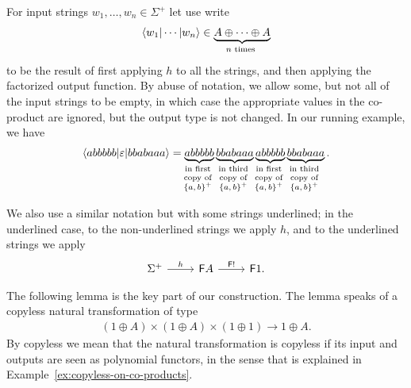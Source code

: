 For  input strings $w_1,\ldots,w_n \in \Sigma^+$ let use write 
\begin{align*}
\tuple{w_1| \cdots | w_n} \in \myunderbrace{A \oplus \cdots \oplus A}{$n$ times}
\end{align*}
to be the result of first applying $h$ to all the strings, and then applying the factorized output function. By abuse of notation, we allow some, but not all of the input strings to be empty, in which case the appropriate values in the co-product are ignored, but the output type is not changed. In our running example, we have 
\begin{align*}
    \tuple{abbbbb | \varepsilon | bbabaaa} =  
    \myunderbrace{abbbbb}{in first \\ copy of \\ $\set{a,b}^+$}
     \myunderbrace{bbabaaa}{in third \\ copy of \\ $\set{a,b}^+$}
     \myunderbrace{abbbbb}{in first \\ copy of \\ $\set{a,b}^+$}
     \myunderbrace{bbabaaa}{in third \\ copy of \\ $\set{a,b}^+$}.
    \end{align*}


We also use a similar notation but with some strings underlined; in the underlined case, to the non-underlined strings we apply $h$, and to the underlined strings we apply 
\[
\begin{tikzcd}
\Sigma^+ 
\ar[r,"h"]
&
\functor A 
\ar[r,"\functor !"]
&
\functor 1.
\end{tikzcd}
\]



The following lemma is the key part of our construction. The lemma speaks of a copyless natural transformation of type 
\begin{align*}
    (1 \oplus A) \times (1 \oplus A) \times (1 \oplus 1) \to 1 \oplus A.
\end{align*}
By copyless we mean that the natural transformation is copyless if its input and outputs are seen as polynomial functors, in the sense that is  explained in Example~\ref{ex:copyless-on-co-products}.


